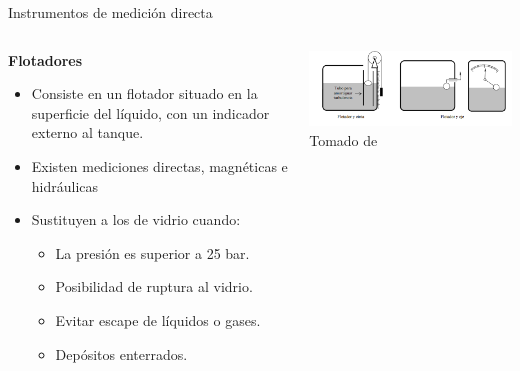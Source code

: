 \documentclass[aspectratio=169]{beamer}
\begin{document}
\begin{frame}{Instrumentos de medición directa}
    \begin{columns}[c, onlytextwidth]
        \begin{column}{0.45\textwidth}
        \textbf{Flotadores}
            \begin{itemize}
                \item Consiste en un flotador situado en la superficie del líquido, con un indicador externo al tanque. 
                \item Existen mediciones directas, magnéticas e hidráulicas  
                \item Sustituyen a los de vidrio cuando: 
                \begin{itemize}
                    \item La presión es superior a 25 bar. 
                    \item Posibilidad de ruptura al vidrio.
                    \item Evitar escape de líquidos o gases. 
                    \item Depósitos enterrados. 
                \end{itemize}
            \end{itemize}
        \end{column}
        \begin{column}{0.50\textwidth}
            \includegraphics[width = 1.1\linewidth]{fig/Nivel/flotador.png}
            \tiny{Tomado de \cite{sole2005instrumentacion}}
        \end{column}
    \end{columns}
\end{frame}

            
\end{document}
